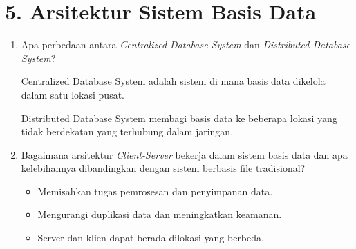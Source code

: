 \documentclass[a4paper,11pt]{article}
\begin{document}
\section*{5. Arsitektur Sistem Basis Data}
\begin{enumerate}[label=\alph*.]
    \item Apa perbedaan antara \textit{Centralized Database System} dan \textit{Distributed Database System}?

      Centralized Database System adalah sistem di mana basis data
      dikelola dalam satu lokasi pusat.

      Distributed Database System membagi basis data ke beberapa lokasi yang tidak
      berdekatan yang terhubung dalam jaringan.

    \item Bagaimana arsitektur \textit{Client-Server} bekerja dalam sistem basis data dan apa kelebihannya dibandingkan dengan sistem berbasis file tradisional?

      \begin{itemize}
        \item Memisahkan tugas pemrosesan dan penyimpanan data. 
        \item Mengurangi duplikasi data dan meningkatkan keamanan.
        \item Server dan klien dapat berada dilokasi yang berbeda.
      \end{itemize}


\end{enumerate}
\end{document}
